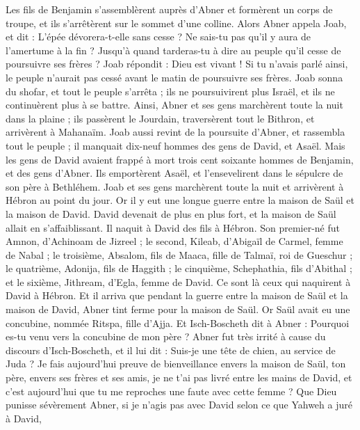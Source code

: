 \begin{multicols}{2}
Les fils de Benjamin s'assemblèrent auprès d'Abner et formèrent un corps de troupe, et ils s'arrêtèrent sur le sommet d'une colline.
Alors Abner appela Joab, et dit : L'épée dévorera-t-elle sans cesse ? Ne sais-tu pas qu'il y aura de l'amertume à la fin ? Jusqu'à quand tarderas-tu à dire au peuple qu'il cesse de poursuivre ses frères ?
Joab répondit : Dieu est vivant ! Si tu n'avais parlé ainsi, le peuple n'aurait pas cessé avant le matin de poursuivre ses frères.
Joab sonna du shofar, et tout le peuple s'arrêta ; ils ne poursuivirent plus Israël, et ils ne continuèrent plus à se battre.
Ainsi, Abner et ses gens marchèrent toute la nuit dans la plaine ; ils passèrent le Jourdain, traversèrent tout le Bithron, et arrivèrent à Mahanaïm.
Joab aussi revint de la poursuite d'Abner, et rassembla tout le peuple ; il manquait dix-neuf hommes des gens de David, et Asaël.
Mais les gens de David avaient frappé à mort trois cent soixante hommes de Benjamin, et des gens d'Abner.
Ils emportèrent Asaël, et l'ensevelirent dans le sépulcre de son père à Bethléhem. Joab et ses gens marchèrent toute la nuit et arrivèrent à Hébron au point du jour.
\VerseOne{}Or il y eut une longue guerre entre la maison de Saül et la maison de David. David devenait de plus en plus fort, et la maison de Saül allait en s'affaiblissant.
Il naquit à David des fils à Hébron. Son premier-né fut Amnon, d'Achinoam de Jizreel ;
le second, Kileab, d'Abigaïl de Carmel, femme de Nabal ; le troisième, Absalom, fils de Maaca, fille de Talmaï, roi de Gueschur ;
le quatrième, Adonija, fils de Haggith ; le cinquième, Schephathia, fils d'Abithal ;
et le sixième, Jithream, d'Egla, femme de David. Ce sont là ceux qui naquirent à David à Hébron.
Et il arriva que pendant la guerre entre la maison de Saül et la maison de David, Abner tint ferme pour la maison de Saül.
Or Saül avait eu une concubine, nommée Ritspa, fille d'Ajja. Et Isch-Boscheth dit à Abner : Pourquoi es-tu venu vers la concubine de mon père ?
Abner fut très irrité à cause du discours d'Isch-Boscheth, et il lui dit : Suis-je une tête de chien, au service de Juda ? Je fais aujourd'hui preuve de bienveillance envers la maison de Saül, ton père, envers ses frères et ses amis, je ne t'ai pas livré entre les mains de David, et c'est aujourd'hui que tu me reproches une faute avec cette femme ?
Que Dieu punisse sévèrement Abner, si je n'agis pas avec David selon ce que Yahweh a juré à David,

\end{multicols}
